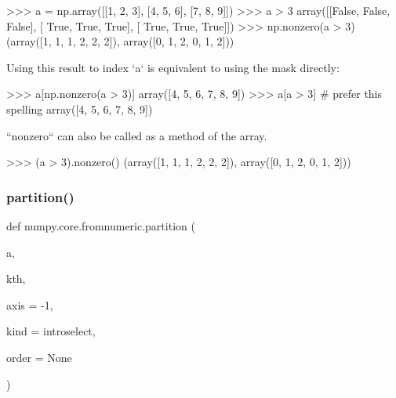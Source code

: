 \begin{DoxyVerb}
>>> a = np.array([[1, 2, 3], [4, 5, 6], [7, 8, 9]])
>>> a > 3
array([[False, False, False],
       [ True,  True,  True],
       [ True,  True,  True]])
>>> np.nonzero(a > 3)
(array([1, 1, 1, 2, 2, 2]), array([0, 1, 2, 0, 1, 2]))

Using this result to index `a` is equivalent to using the mask directly:

>>> a[np.nonzero(a > 3)]
array([4, 5, 6, 7, 8, 9])
>>> a[a > 3]  # prefer this spelling
array([4, 5, 6, 7, 8, 9])

``nonzero`` can also be called as a method of the array.

>>> (a > 3).nonzero()
(array([1, 1, 1, 2, 2, 2]), array([0, 1, 2, 0, 1, 2]))\end{DoxyVerb}
 \mbox{\label{namespacenumpy_1_1core_1_1fromnumeric_a7573136b0de8f6cdd27cd1f5219b476b}} 
\subsubsection{\texorpdfstring{partition()}{partition()}}
{\footnotesize\ttfamily def numpy.\+core.\+fromnumeric.\+partition (\begin{DoxyParamCaption}\item[{}]{a,  }\item[{}]{kth,  }\item[{}]{axis = {\ttfamily -\/1},  }\item[{}]{kind = {\ttfamily \textquotesingle{}introselect\textquotesingle{}},  }\item[{}]{order = {\ttfamily None} }\end{DoxyParamCaption})}

